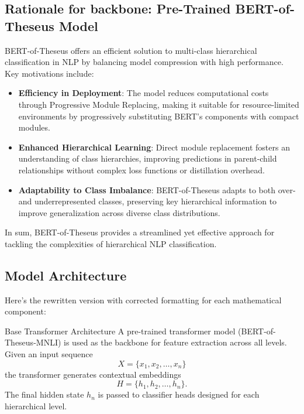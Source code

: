 \documentclass[9pt,a4paper,twoside]{rho-class/rho}
\begin{document}
    \subsection{\textbf{Rationale for backbone: Pre-Trained BERT-of-Theseus Model}}

        BERT-of-Theseus offers an efficient solution to multi-class hierarchical classification in NLP by balancing model compression with high performance. Key motivations include:

\begin{itemize}
    \item \textbf{Efficiency in Deployment}: The model reduces computational costs through Progressive Module Replacing, making it suitable for resource-limited environments by progressively substituting BERT’s components with compact modules.

    \item \textbf{Enhanced Hierarchical Learning}: Direct module replacement fosters an understanding of class hierarchies, improving predictions in parent-child relationships without complex loss functions or distillation overhead.
    
    \item \textbf{Adaptability to Class Imbalance}: BERT-of-Theseus adapts to both over- and underrepresented classes, preserving key hierarchical information to improve generalization across diverse class distributions.
\end{itemize}

In sum, BERT-of-Theseus provides a streamlined yet effective approach for tackling the complexities of hierarchical NLP classification.

  \subsection{Model Architecture}
    
        Here’s the rewritten version with corrected formatting for each mathematical component:

        Base Transformer Architecture  
        A pre-trained transformer model (BERT-of-Theseus-MNLI) is used as the backbone for feature extraction across all levels. Given an input sequence 
        \[
        X = \{x_1, x_2, \ldots, x_n\}
        \]
        the transformer generates contextual embeddings 
        \[
        H = \{h_1, h_2, \ldots, h_n\}.
        \]
        The final hidden state \( h_n \) is passed to classifier heads designed for each hierarchical level.
        
\end{document}
